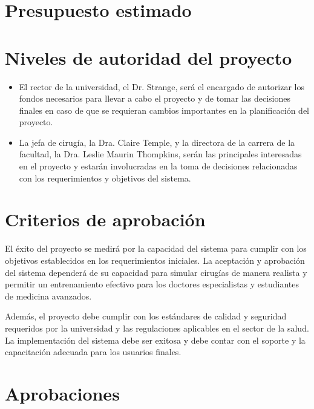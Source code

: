\begin{table}[h]
  \end{table}

  \section{Presupuesto estimado}
  \lipsum[1-2]

  \section{Niveles de autoridad del proyecto}
  \begin{itemize}
    \item El rector de la universidad, el Dr. Strange, será el encargado de autorizar los fondos necesarios para llevar a cabo el proyecto y de tomar las decisiones finales en caso de que se requieran cambios importantes en la planificación del proyecto.
    \item La jefa de cirugía, la Dra. Claire Temple, y la directora de la carrera de la facultad, la Dra. Leslie Maurin Thompkins, serán las principales interesadas en el proyecto y estarán involucradas en la toma de decisiones relacionadas con los requerimientos y objetivos del sistema.
  \end{itemize}

  \section{Criterios de aprobación}
  El éxito del proyecto se medirá por la capacidad del sistema para cumplir con los objetivos establecidos en los requerimientos iniciales. La aceptación y aprobación del sistema dependerá de su capacidad para simular cirugías de manera realista y permitir un entrenamiento efectivo para los doctores especialistas y estudiantes de medicina avanzados.

  Además, el proyecto debe cumplir con los estándares de calidad y seguridad requeridos por la universidad y las regulaciones aplicables en el sector de la salud. La implementación del sistema debe ser exitosa y debe contar con el soporte y la capacitación adecuada para los usuarios finales.

  \section{Aprobaciones}
  \firmasaprobaciones


